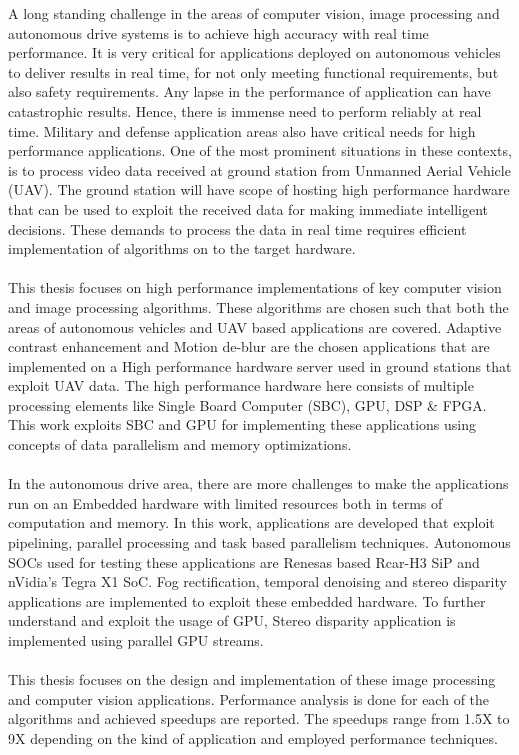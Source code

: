 A long standing challenge in the areas of computer vision, image processing and autonomous drive systems is to achieve high accuracy with real time performance. It is very critical for applications deployed on autonomous vehicles to deliver results in real time, for not only meeting functional requirements, but also safety requirements. Any lapse in the performance of application can have catastrophic results. Hence, there is immense need to perform reliably at real time. Military and defense application areas also have critical needs for high performance applications. One of the most prominent situations in these contexts, is to process video data received at ground station from Unmanned Aerial Vehicle (UAV). The ground station will have scope of hosting high performance hardware that can be used to exploit the received data for making immediate intelligent decisions. These demands to process the data in real time requires efficient implementation of algorithms on to the target hardware. \paragraph*{}This thesis focuses on high performance implementations of key computer vision and image processing algorithms. These algorithms are chosen such that both the areas of autonomous vehicles and UAV based applications are covered. Adaptive contrast enhancement and Motion de-blur are the chosen applications that are implemented on a High performance hardware server used in ground stations that exploit UAV data. The high performance hardware here consists of multiple processing elements like Single Board Computer (SBC), GPU, DSP \& FPGA. This work exploits SBC and GPU for implementing these applications using concepts of data parallelism and memory optimizations.
\paragraph*{}In the autonomous drive area, there are more challenges to make the applications run on an Embedded hardware with limited resources both in terms of computation and memory. In this work, applications are developed that exploit pipelining, parallel processing and task based parallelism techniques. Autonomous SOCs used for testing these applications are Renesas based Rcar-H3 SiP and nVidia’s Tegra X1 SoC. Fog rectification, temporal denoising and stereo disparity applications are implemented to exploit these embedded hardware. To further understand and exploit the usage of GPU, Stereo disparity application is implemented using parallel GPU streams. \paragraph*{}This thesis focuses on the design and implementation of these image processing and computer vision applications. Performance analysis is done for each of the algorithms and achieved speedups are reported. The speedups range from 1.5X to 9X depending on the kind of application and employed performance techniques.
